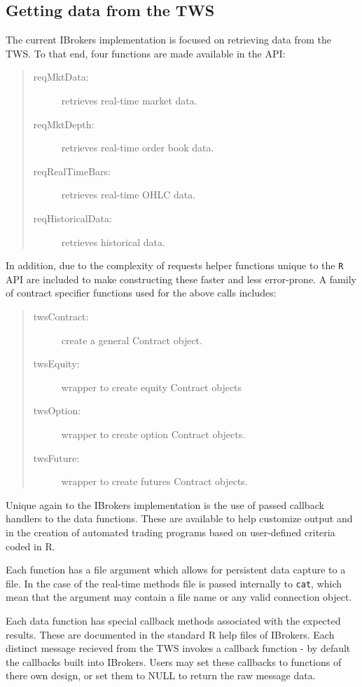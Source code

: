 \documentclass{article}
\begin{document}
\subsection{Getting data from the TWS}
The current IBrokers implementation is focused on
retrieving data from the TWS. To that end, four
functions are made available in the API:
\begin{quote}
\begin{description}
\item[reqMktData:] retrieves real-time market data.
\item[reqMktDepth:] retrieves real-time order book data.
\item[reqRealTimeBars:] retrieves real-time OHLC data.
\item[reqHistoricalData:] retrieves historical data.
\end{description}
\end{quote}
In addition, due to the complexity of requests
helper functions unique to the {\tt R} API
are included to make constructing these faster
and less error-prone. A family of contract
specifier functions used for the above calls
includes:
\begin{quote}
\begin{description}
\item[twsContract:] create a general Contract object.
\item[twsEquity:] wrapper to create equity Contract objects
\item[twsOption:] wrapper to create option Contract objects.
\item[twsFuture:] wrapper to create futures Contract objects.
\end{description}
\end{quote}
Unique again to the IBrokers implementation is the
use of passed callback handlers to the data functions. These are
available to help customize output and in the creation of
automated trading programs based on user-defined criteria
coded in R.

Each function has a file argument which allows for persistent
data capture to a file.  In the case of the real-time methods
file is passed internally to {\tt cat}, which mean that the
argument may contain a file name or any valid connection
object.

Each data function has special callback methods
associated with the expected results. These are documented
in the standard R help files of IBrokers.
Each distinct message recieved from the TWS
invokes a callback function - by default the callbacks
built into IBrokers. Users may set these callbacks to
functions of there own design, or set them to NULL to
return the raw message data.
\end{document}
